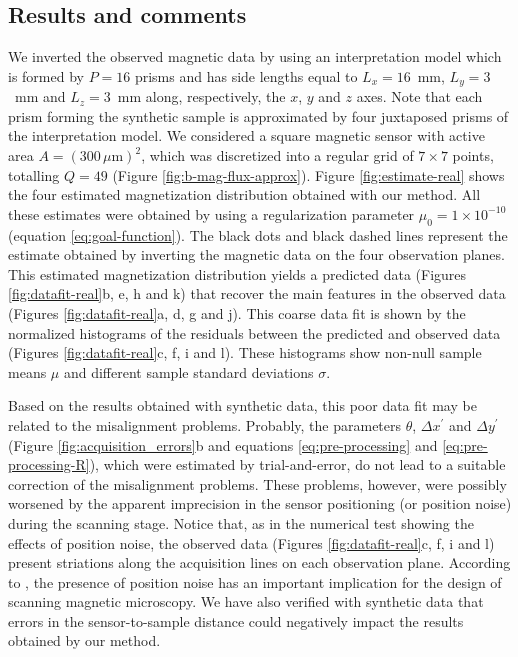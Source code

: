 \documentclass[draft,gc]{agutex}
\begin{document}
\begin{article}
\subsection{Results and comments}
\label{subsec:Results and comments}

We inverted the observed magnetic data by using an
interpretation model which is formed by $P = 16$ prisms
and has side lengths equal to $L_{x} = 16$~mm, $L_{y} = 3$~mm 
and $L_{z} = 3$~mm along, respectively, the $x$, $y$ and 
$z$ axes.
Note that each prism forming the synthetic sample is 
approximated by four juxtaposed prisms of the 
interpretation model.
We considered a square magnetic sensor with active area  
$A = (300 \, \mu \text{m})^{2}$, which was discretized into
a regular grid of $7 \times 7$ points, totalling $Q = 49$
(Figure \ref{fig:b-mag-flux-approx}).
Figure \ref{fig:estimate-real} shows the four estimated
magnetization distribution obtained with our method.
All these estimates were obtained by using a regularization
parameter $\mu_{0} = 1 \times 10^{-10}$ (equation \ref{eq:goal-function}).
The black dots and black dashed lines represent the estimate
obtained by inverting the magnetic data on the four observation planes.
This estimated magnetization distribution yields a predicted data
(Figures \ref{fig:datafit-real}b, e, h and k) that recover
the main features in the observed data (Figures \ref{fig:datafit-real}a, 
d, g and j).
This coarse data fit is shown by the normalized histograms of 
the residuals between the predicted and
observed data (Figures \ref{fig:datafit-real}c, f, i and l).
These histograms show non-null sample means $\mu$ and 
different sample standard deviations $\sigma$.

Based on the results obtained with synthetic data,
this poor data fit may be related to the misalignment problems.
Probably, the parameters $\theta$, $\Delta x^{\prime}$ and 
$\Delta y^{\prime}$ (Figure \ref{fig:acquisition_errors}b and 
equations \ref{eq:pre-processing} and \ref{eq:pre-processing-R}),
which were estimated by trial-and-error, do not lead to a suitable
correction of the misalignment problems.
These problems, however, were possibly worsened by the
apparent imprecision in the sensor positioning (or position noise)
during the scanning stage.
Notice that, as in the numerical test showing the effects of
position noise, the observed data (Figures \ref{fig:datafit-real}c, f, i and l)
present striations along the acquisition lines on each
observation plane.
According to \citet{lee2004}, the presence of position noise has 
an important implication for the design of scanning magnetic microscopy.
We have also verified with synthetic data that errors in the 
sensor-to-sample distance could negatively impact the results obtained
by our method.


\end{article}
\end{document}
